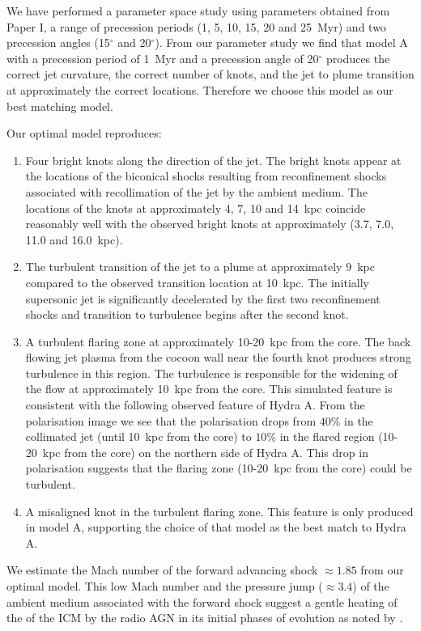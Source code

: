 \documentclass[useAMS, usenatbib]{mn2e}
\begin{document}
We have performed a parameter space study using parameters obtained from Paper I, a range of precession periods (1, 5, 10, 15, 20 and 25~Myr) and two precession angles (15$^{\circ}$ and 20$^{\circ}$). From our parameter study we find that model A with a precession period of 1~Myr and a precession angle of 20$^{\circ}$ produces the correct jet curvature, the correct number of knots, and the jet to plume transition at approximately the correct locations. Therefore we choose this model as our best matching model. 

Our optimal model reproduces:
\begin{enumerate}
\item Four bright knots along the direction of the jet. The bright knots appear at the locations of the biconical shocks resulting from reconfinement shocks associated with recollimation of the jet by the ambient medium. The locations of the knots at approximately 4, 7, 10 and 14~kpc coincide reasonably well with the observed bright knots at approximately (3.7, 7.0, 11.0 and 16.0~kpc). 
\item The turbulent transition of the jet to a plume at approximately $9$~kpc compared to the observed transition location at 10~kpc. The initially supersonic jet is significantly decelerated by the first two reconfinement shocks and transition to turbulence begins after the second knot.  
\item A turbulent flaring zone at approximately 10-20~kpc from the core. The back flowing jet plasma from the cocoon wall near the fourth knot produces strong turbulence in this region. The turbulence is responsible for the widening of the flow at approximately 10~kpc from the core. This simulated feature is consistent with the following observed feature of Hydra A. From the polarisation image \citep{taylor90} we see that the polarisation drops from $40\%$ in the collimated jet (until 10~kpc from the core) to $10\%$ in the flared region (10-20~kpc from the core) on the northern side of Hydra A. This drop in polarisation suggests that the flaring zone (10-20~kpc from the core) could be turbulent.
\item A misaligned knot in the turbulent flaring zone. This feature is only produced in model A, supporting the choice of that model as the best match to Hydra A. 
\end{enumerate}

We estimate the Mach number of the forward advancing shock $\approx 1.85$ from our optimal model. This low Mach number and the pressure jump ($\approx 3.4$) of the ambient medium associated with the forward shock  suggest a gentle heating of the of the ICM by the radio AGN in its initial phases of evolution as noted by \citet{mcnamara12}. 
\end{document}

